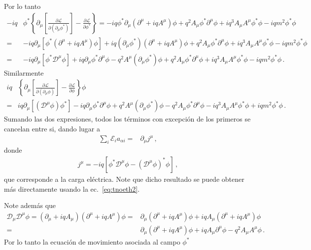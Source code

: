 Por lo tanto
\begin{align}
-iq &\phi^{*} \left\{\partial_{\mu} \left[ \frac{\partial \mathcal{L}}{\partial \left( \partial_{\mu}\phi^{*} \right)} \right]-\frac{\partial \mathcal{L}}{\partial \phi^{*}} \right\}   
= -iq \phi^{*}\partial_{\mu}\left( \partial^{\mu}+iq A^{\mu} \right)\phi+q^2 A_{\mu}  \phi^{*} \partial^{\mu}\phi +iq^3 A_{\mu}A^{\mu}\phi^{*}\phi-iq m^2\phi^{*}\phi \nonumber\\
  =& -iq \partial_{\mu} \left[ \phi^{*}\left( \partial^{\mu}+iq A^{\mu} \right)\phi \right]+iq \left( \partial_{\mu} \phi^{*}\right)\left( \partial^{\mu}+iq A^{\mu} \right)\phi +q^2 A_{\mu}  \phi^{*} \partial^{\mu}\phi +iq^3 A_{\mu}A^{\mu}\phi^{*}\phi-iq m^2\phi^{*}\phi \nonumber\\
  =& -iq \partial_{\mu} \left[ \phi^{*}\mathcal{D}^{\mu}\phi \right]+iq  \partial_{\mu} \phi^{*}\partial^{\mu}\phi-q^2A^\mu \left( \partial_{\mu} \phi^{*} \right)\phi  +q^2 A_{\mu}  \phi^{*} \partial^{\mu}\phi +iq^3 A_{\mu}A^{\mu}\phi^{*}\phi-iq m^2\phi^{*}\phi\,. 
\end{align}
Similarmente
\begin{align}
  iq &\left\{\partial_{\mu} \left[ \frac{\partial \mathcal{L}}{\partial \left( \partial_{\mu}\phi \right)} \right]-\frac{\partial \mathcal{L}}{\partial \phi} \right\} \phi \nonumber\\
  =& iq \partial_{\mu} \left[ \left(  \mathcal{D}^{\mu}\phi \right) \phi^{*} \right]-iq  \partial_{\mu} \phi^{*}\partial^{\mu}\phi+q^2A^\mu \left( \partial_{\mu} \phi^{*} \right)\phi  -q^2 A_{\mu}  \phi^{*} \partial^{\mu}\phi -iq^3 A_{\mu}A^{\mu}\phi^{*}\phi+iq m^2\phi^{*}\phi\,. 
\end{align}
Sumando las dos expresiones, todos los términos con excepción de los primeros se cancelan entre si, dando lugar a 
\begin{align}
   \sum_{i}\mathcal{E}_{i} a_{\alpha i}=& \partial_{\mu} j^{\mu}\,,
\end{align}
donde
\begin{align}
  j^{\mu}=-iq \left[  \phi^{*}\mathcal{D}^{\mu}\phi -  \left(  \mathcal{D}^{\mu}\phi \right)^{*} \phi\right]\,,
\end{align}
que corresponde a la carga eléctrica. Note que dicho resultado se puede obtener más directamente usando la ec.~\eqref{eq:tnoeth2}.

Note además que 
\begin{align}
\mathcal{D}_{\mu}\mathcal{D}^{\mu}\phi=  \left( \partial_{\mu}+iq A_{\mu}  \right)\left( \partial^{\mu}+iq A^{\mu} \right)\phi=& \partial_{\mu}\left( \partial^{\mu}+iq A^{\mu} \right)\phi+iq A_{\mu}  \left( \partial^{\mu}+iq A^{\mu} \right)\phi \nonumber\\
=& \partial_{\mu}\left( \partial^{\mu}+iq A^{\mu} \right)\phi+iq A_{\mu}   \partial^{\mu}\phi -q^2 A_{\mu}A^{\mu}\phi\,.
\end{align}
Por lo tanto la ecuación de movimiento asociada al campo $\phi^{*}$



